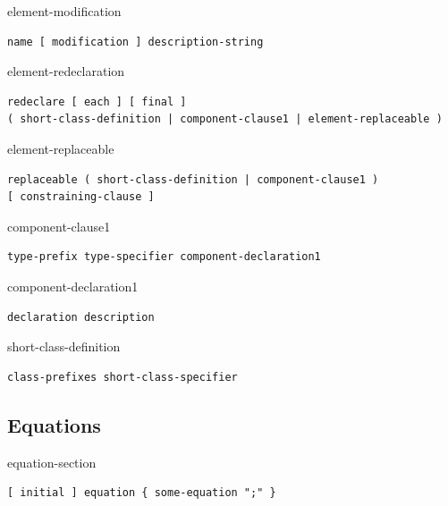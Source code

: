 \begin{production}{element-modification}
\begin{lstlisting}
name [ modification ] description-string
\end{lstlisting}
\end{production}

\begin{production}{element-redeclaration}
\begin{lstlisting}
redeclare [ each ] [ final ]
( short-class-definition | component-clause1 | element-replaceable )
\end{lstlisting}
\end{production}

\begin{production}{element-replaceable}
\begin{lstlisting}
replaceable ( short-class-definition | component-clause1 )
[ constraining-clause ]
\end{lstlisting}
\end{production}

\begin{production}{component-clause1}
\begin{lstlisting}
type-prefix type-specifier component-declaration1
\end{lstlisting}
\end{production}

\begin{production}{component-declaration1}
\begin{lstlisting}
declaration description
\end{lstlisting}
\end{production}

\begin{production}{short-class-definition}
\begin{lstlisting}
class-prefixes short-class-specifier
\end{lstlisting}
\end{production}


\subsection{Equations}\label{equations1}

\begin{production}{equation-section}
\begin{lstlisting}
[ initial ] equation { some-equation ";" }
\end{lstlisting}
\end{production}

